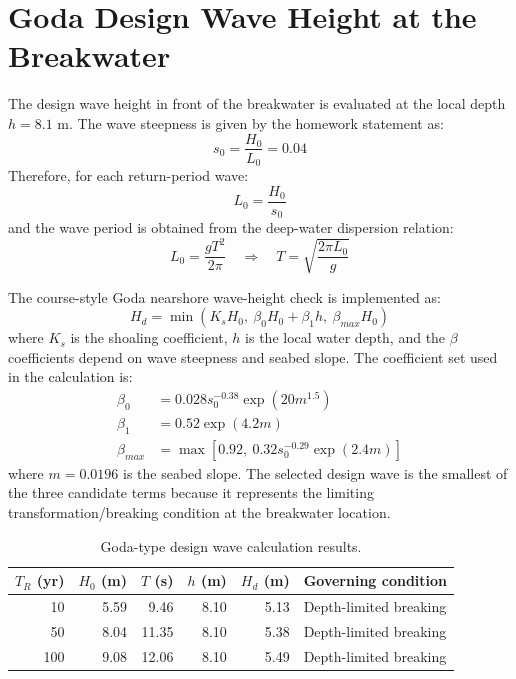 \documentclass[11pt,a4paper]{article}
\begin{document}
\section{Goda Design Wave Height at the Breakwater}
The design wave height in front of the breakwater is evaluated at the local depth $h=8.1$ m. The wave steepness is given by the homework statement as:
\begin{equation}
s_0=\frac{H_0}{L_0}=0.04
\end{equation}
Therefore, for each return-period wave:
\begin{equation}
L_0=\frac{H_0}{s_0}
\end{equation}
and the wave period is obtained from the deep-water dispersion relation:
\begin{equation}
L_0=\frac{gT^2}{2\pi} \quad \Rightarrow \quad T=\sqrt{\frac{2\pi L_0}{g}}
\end{equation}

The course-style Goda nearshore wave-height check is implemented as:
\begin{equation}
H_d = \min\left(K_sH_0,\ \beta_0H_0+\beta_1h,\ \beta_{max}H_0\right)
\end{equation}
where $K_s$ is the shoaling coefficient, $h$ is the local water depth, and the $\beta$ coefficients depend on wave steepness and seabed slope. The coefficient set used in the calculation is:
\begin{align}
\beta_0 &= 0.028s_0^{-0.38}\exp(20m^{1.5}) \\
\beta_1 &= 0.52\exp(4.2m) \\
\beta_{max} &= \max\left[0.92,\ 0.32s_0^{-0.29}\exp(2.4m)\right]
\end{align}
where $m=0.0196$ is the seabed slope. The selected design wave is the smallest of the three candidate terms because it represents the limiting transformation/breaking condition at the breakwater location.

\begin{table}[H]
\centering
\caption{Goda-type design wave calculation results.}
\begin{tabular}{rrrrrl}
\toprule
\textbf{$T_R$ (yr)} & \textbf{$H_0$ (m)} & \textbf{$T$ (s)} & \textbf{$h$ (m)} & \textbf{$H_d$ (m)} & \textbf{Governing condition} \\
\midrule
10 & 5.59 & 9.46 & 8.10 & 5.13 & Depth-limited breaking \\
50 & 8.04 & 11.35 & 8.10 & 5.38 & Depth-limited breaking \\
100 & 9.08 & 12.06 & 8.10 & 5.49 & Depth-limited breaking \\
\bottomrule
\end{tabular}
\end{table}
\end{document}
